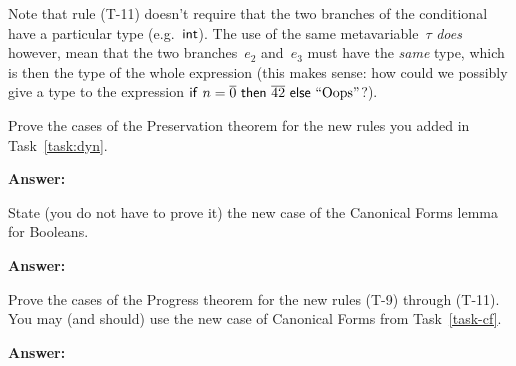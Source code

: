 \documentclass{article}
\begin{document}
Note that rule (T-11) doesn't require that the two branches of the conditional
have a particular type (e.g.~$\mathsf{int}$).
%
The use of the same metavariable~$\tau$ {\em does} however, mean that the
two branches~$e_2$ and~$e_3$ must have the {\em same} type, which is then the
type of the whole expression
(this makes sense: how could we possibly give a type to the expression
$\mathsf{if}~n = \overline{0}~\mathsf{then}~\overline{42}~\mathsf{else}~\text{``}\text{Oops}\text{''}$?).

\begin{task}
  Prove the cases of the Preservation theorem for the new rules you
  added in Task~\ref{task:dyn}.
\end{task}

\textbf{Answer:}

\begin{task}\label{task-cf}
  State (you do not have to prove it) the new case of the Canonical Forms
  lemma for Booleans.
\end{task}

\textbf{Answer:}

\begin{task}
  Prove the cases of the Progress theorem for the new rules
  (T-9) through (T-11). You may (and should) use the new case of Canonical
  Forms from Task~\ref{task-cf}.
\end{task}

\textbf{Answer:}
\end{document}
